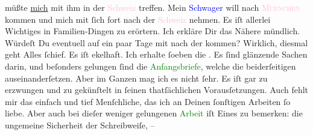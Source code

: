               müßte \uline{mich} mit ihm in der \textcolor{pink}{Schweiz}{}\ledrightnote{\textcolor{pink}{Schweiz}} treffen. Mein \textcolor{blue}{Schwager}{} will nach \textsc{\textcolor{pink}{Muenchen}{}\ledrightnote{\textcolor{pink}{München}}} kommen und mich mit ſich fort nach der {\pb}\textcolor{pink}{Schweiz}{}\ledrightnote{\textcolor{pink}{Schweiz}} nehmen. Es iſt allerlei Wichtiges in
               Familien-Dingen zu erörtern. Ich erkläre Dir das Nähere mündlich. Würdeſt Du
               eventuell auf ein paar Tage mit nach der \label{K_L02746-2v}\label{K_L02746-2h} kommen?\pend
           \pstart
           Wirklich, diesmal geht Alles ſchief. Es iſt ekelhaft.\pend
           \pstart
           Ich erhalte ſoeben die \label{K_L02746-3v}\label{K_L02746-3h}. Es ſind
               glänzende Sachen darin, und beſonders gelungen ſind die \textcolor{green}{Anfangsbriefe}{}, welche die beiderſeitigen
                  \label{K_L02746-4v}\label{K_L02746-4h}
               auseinanderſetzen. Aber im Ganzen {\pb} mag ich es nicht ſehr. Es iſt gar zu
               erzwungen und zu gekünſtelt in ſeinen thatſächlichen Vorausſetzungen. Auch fehlt mir
               das einfach und tief Menſchliche, das ich an Deinen ſonſtigen Arbeiten ſo liebe. Aber
               auch bei dieſer weniger gelungenen \textcolor{green}{Arbeit}{} iſt Eines zu bemerken: die ungemeine Sicherheit der Schreibweiſe, –
